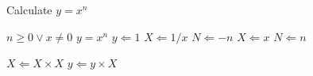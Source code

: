 \usepackage{algorithm}  
\usepackage{algorithmic}

\begin{algorithm}
\caption{Calculate $y=x^n$}
\label{alg:alg1}
\begin{algorithmic}
\REQUIRE  $n \geq 0 \vee x \neq 0$
\ENSURE $y = x^n$
\STATE $y \Leftarrow 1$
\STATE $X \Leftarrow 1/ x$
\STATE $N \Leftarrow -n$
\ELSE
\STATE $X \Leftarrow x$
\STATE $N \Leftarrow n$
\ENDIF

\STATE $X \Leftarrow X \times X$
\ELSE[$N$ is odd]
\STATE $y \Leftarrow y \times X$
\ENDIF
\ENDWHILE
\end{algorithmic}
\end{algorithm}